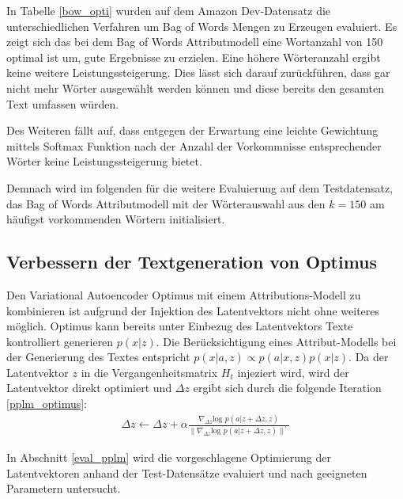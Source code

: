In Tabelle \ref{bow_opti} wurden auf dem Amazon Dev-Datensatz die unterschiedlichen Verfahren um Bag of Words Mengen zu Erzeugen evaluiert.
Es zeigt sich das bei dem Bag of Words Attributmodell eine Wortanzahl von 150 optimal ist um, gute Ergebnisse zu erzielen. 
Eine höhere Wörteranzahl ergibt keine weitere Leistungssteigerung. Dies lässt sich darauf zurückführen, dass gar nicht mehr Wörter ausgewählt werden können und diese bereits den gesamten Text umfassen würden.

Des Weiteren fällt auf, dass entgegen der Erwartung eine leichte Gewichtung mittels Softmax Funktion nach der Anzahl der Vorkommnisse entsprechender Wörter keine Leistungssteigerung bietet.

Demnach wird im folgenden für die weitere Evaluierung auf dem Testdatensatz, das Bag of Words Attributmodell mit der Wörterauswahl aus den $k=150$ am häufigst vorkommenden Wörtern initialisiert.

\subsection{Verbessern der Textgeneration von Optimus}
Den Variational Autoencoder Optimus mit einem Attributions-Modell zu kombinieren ist aufgrund der Injektion des Latentvektors nicht ohne weiteres möglich.
Optimus kann bereits unter Einbezug des Latentvektors Texte kontrolliert generieren $p(x|z)$.
Die Berücksichtigung eines Attribut-Modells bei der Generierung des Textes entspricht $p(x|a,z) \propto p(a|x,z)p(x|z)$. %
Da der Latentvektor $z$ in die Vergangenheitsmatrix $H_t$ injeziert wird, wird der Latentvektor direkt optimiert und $\Delta z$ ergibt sich durch die folgende Iteration \ref{pplm_optimus}:
\begin{align}
    \label{pplm_optimus}
    \Delta z \leftarrow \Delta z + \alpha \frac{\nabla_{\Delta z} \text{log }p(a|z+\Delta z,z)}{\| \nabla_{\Delta z} \text{log }p(a|z+\Delta z,z)\|^\gamma}
\end{align}

In Abschnitt \ref*{eval_pplm} wird die vorgeschlagene Optimierung der Latentvektoren anhand der Test-Datensätze evaluiert und nach geeigneten Parametern untersucht.


